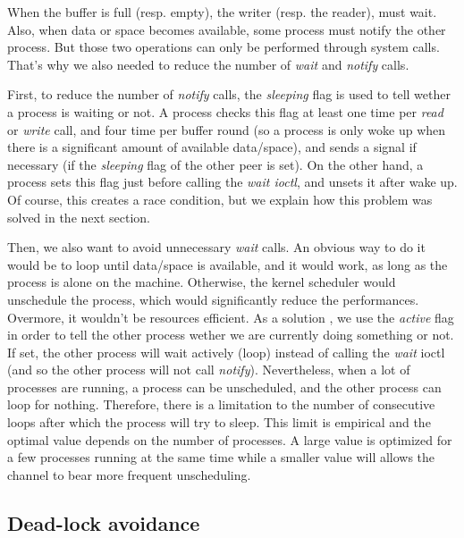 \documentclass[journal]{IEEEtran}
\begin{document}
When the buffer is full (resp. empty), the writer (resp. the reader), must wait. Also, when data or space becomes available, some process must notify the other process. But those two operations can only be performed through system calls. That's why we also needed to reduce the number of \emph{wait} and \emph{notify} calls. 

First, to reduce the number of \emph{notify} calls, the \emph{sleeping} flag is used to tell wether a process is waiting or not. A process checks this flag at least one time per \emph{read} or \emph{write} call, and four time per buffer round (so a process is only woke up when there is a significant amount of available data/space), and sends a signal if necessary (if the \emph{sleeping} flag of the other peer is set).
On the other hand, a process sets this flag just before calling the \emph{wait ioctl}, and unsets it after wake up. Of course, this creates a race condition, but we explain how this problem was solved in the next section.

Then, we also want to avoid unnecessary \emph{wait} calls. An obvious way to do it would be to loop until data/space is available, and it would work, as long as the process is alone on the machine. Otherwise, the kernel scheduler would unschedule the process, which would significantly reduce the performances. Overmore, it wouldn't be resources efficient.
As a solution , we use the \emph{active} flag in order to tell the other process wether we are currently doing something or not.
If set, the other process will wait actively (loop) instead of calling the \emph{wait} ioctl (and so the other process will not call \emph{notify}). Nevertheless, when a lot of processes are running, a process can be unscheduled, and the other process can loop for nothing. Therefore, there is a limitation to the number of consecutive loops after which the process will try to sleep. This limit is empirical and the optimal value depends on the number of processes. A large value is optimized for a few processes running at the same time while a smaller value will allows the channel to bear more frequent unscheduling.  


\subsection{Dead-lock avoidance}
\end{document}
